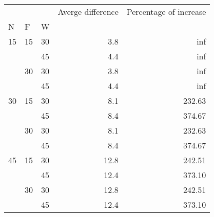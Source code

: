 \begin{tabular}{lllrr}
\toprule
   &    &    &  Averge difference &  Percentage of increase \\
N & F & W &                    &                         \\
\midrule
15 & 15 & 30 &                3.8 &                     inf \\
   &    & 45 &                4.4 &                     inf \\
   & 30 & 30 &                3.8 &                     inf \\
   &    & 45 &                4.4 &                     inf \\
30 & 15 & 30 &                8.1 &                  232.63 \\
   &    & 45 &                8.4 &                  374.67 \\
   & 30 & 30 &                8.1 &                  232.63 \\
   &    & 45 &                8.4 &                  374.67 \\
45 & 15 & 30 &               12.8 &                  242.51 \\
   &    & 45 &               12.4 &                  373.10 \\
   & 30 & 30 &               12.8 &                  242.51 \\
   &    & 45 &               12.4 &                  373.10 \\
\bottomrule
\end{tabular}
